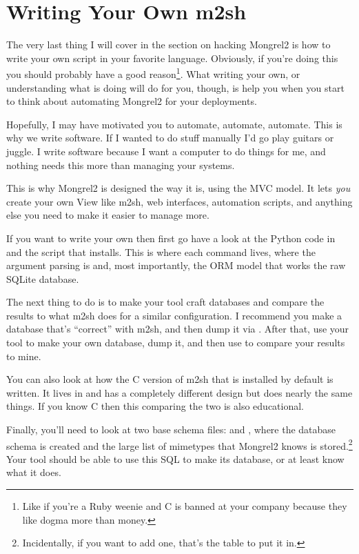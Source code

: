 \section{Writing Your Own m2sh}

The very last thing I will cover in the section on hacking Mongrel2 is how to
write your own  script in your favorite language.  Obviously, if
you're doing this you should probably have a good reason\footnote{Like if
you're a Ruby weenie and C is banned at your company because they like
dogma more than money.}.  What writing your own, or understanding what
 is doing will do for you, though, is help you when you start to
think about automating Mongrel2 for your deployments.

Hopefully, I may have motivated you to automate, automate, automate.
This is why we write software.  If I wanted to do stuff manually I'd
go play guitars or juggle.  I write software because I want a computer
to do things for me, and nothing needs this more than managing your systems.

This is why Mongrel2 is designed the way it is, using the MVC model.  It
lets \emph{you} create your own View like m2sh, web interfaces, automation
scripts, and anything else you need to make it easier to manage more.

If you want to write your own  then first go have a look at the
Python code in  and the  script that
installs.  This is where each command lives, where the argument parsing is and,
most importantly, the ORM model that works the raw SQLite database.

The next thing to do is to make your tool craft databases and compare the
results to what m2sh does for a similar configuration.  I recommend you make
a database that's ``correct'' with m2sh, and then dump it via .
After that, use your tool to make your own database, dump it, and then use
 to compare your results to mine.

You can also look at how the C version of m2sh that is installed by default
is written.  It lives in  and has a completely different
design but does nearly the same things.  If you know C then this comparing
the two is also educational.

Finally, you'll need to look at two base schema files:
 and , where
the database schema is created and the large list of mimetypes that
Mongrel2 knows is stored.\footnote{Incidentally, if you want to add one,
that's the table to put it in.}  Your tool should be able to use this
SQL to make its database, or at least know what it does.

